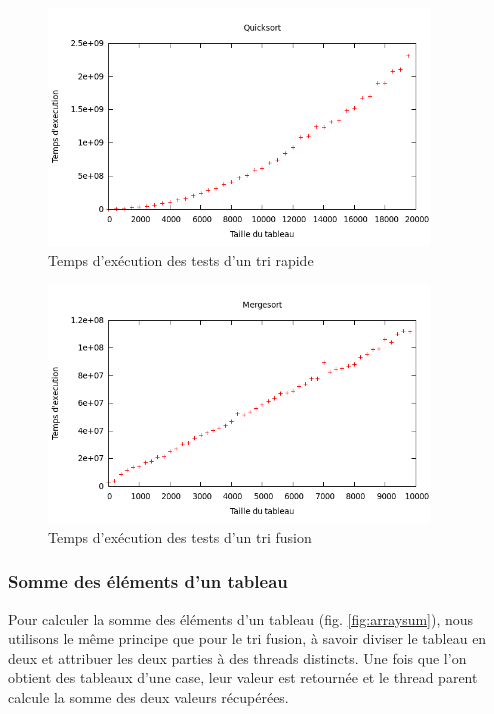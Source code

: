 \begin{figure}[H]
\centering
\includegraphics[width=0.9\textwidth]{figures/quicksort.png}
\caption{Temps d'exécution des tests d'un tri rapide}
\label{fig:quicksort}
\end{figure}

\begin{figure}[H]
\centering
\includegraphics[width=0.9\textwidth]{figures/mergesort.png}
\caption{Temps d'exécution des tests d'un tri fusion}
\label{fig:mergesort}
\end{figure}

\subsubsection{Somme des éléments d'un tableau} Pour calculer la somme des
éléments d'un tableau (fig. \ref{fig:arraysum}), nous utilisons le même principe que pour le tri fusion,
à savoir diviser le tableau en deux et attribuer les deux parties à des threads
distincts. Une fois que l'on obtient des tableaux d'une case, leur valeur est
retournée et le thread parent calcule la somme des deux valeurs récupérées.

